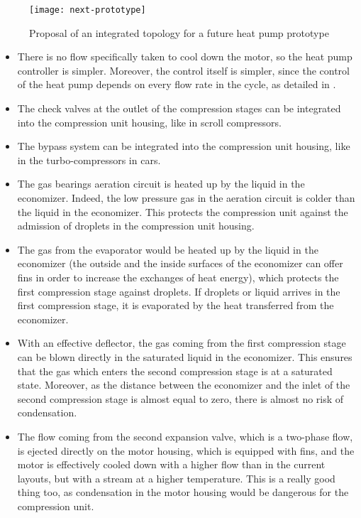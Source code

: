 \begin{figure}[h!tbp]
  \centering
  \texttt{[image: next-prototype]}
  \caption{Proposal of an integrated topology for a future heat pump
    prototype}
  \label{fig:next-prototype}
\end{figure}

\begin{itemize}
\item There is no flow specifically taken to cool down the motor, so
  the heat pump controller is simpler. Moreover, the control itself is
  simpler, since the control of the heat pump depends on every flow
  rate in the cycle, as detailed in .
\item The check valves at the outlet of the compression stages can be
  integrated into the compression unit housing, like in scroll
  compressors.
\item The bypass system can be integrated into the compression unit
  housing, like in the turbo-compressors in cars.
\item The gas bearings aeration circuit is heated up by the liquid in
  the economizer. Indeed, the low pressure gas in the aeration circuit
  is colder than the liquid in the economizer. This protects the
  compression unit against the admission of droplets in the
  compression unit housing.
\item The gas from the evaporator would be heated up by the liquid in
  the economizer (the outside and the inside surfaces of the
  economizer can offer fins in order to increase the exchanges of heat
  energy), which protects the first compression stage against
  droplets. If droplets or liquid arrives in the first compression
  stage, it is evaporated by the heat transferred from the economizer.
\item With an effective deflector, the gas coming from the first
  compression stage can be blown directly in the saturated liquid in
  the economizer. This ensures that the gas which enters the second
  compression stage is at a saturated state. Moreover, as the distance
  between the economizer and the inlet of the second compression stage
  is almost equal to zero, there is almost no risk of condensation.
\item The flow coming from the second expansion valve, which is a
  two-phase flow, is ejected directly on the motor housing, which is
  equipped with fins, and the motor is effectively cooled down with a
  higher flow than in the current layouts, but with a stream at a
  higher temperature. This is a really good thing too, as condensation
  in the motor housing would be dangerous for the compression unit.
\end{itemize}

